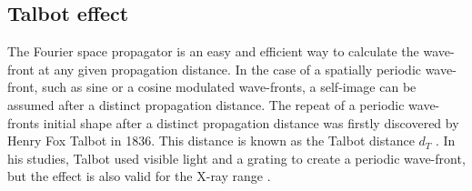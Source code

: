 \subsection{Talbot effect}\label{subsec:te}
The Fourier space propagator is an easy and efficient way to calculate the wave-front at any given propagation distance. In the case of a spatially periodic wave-front, such as sine or a cosine modulated wave-fronts, a self-image can be assumed after a distinct propagation distance. The repeat of a periodic wave-fronts initial shape after a distinct propagation distance was firstly discovered by Henry Fox Talbot in 1836. This distance is known as the Talbot distance $d_{T}$ \citep{Talbot1836}. In his studies, Talbot used visible light and a grating to create a periodic wave-front, but the effect is also valid for the X-ray range \citep{David2002}.

